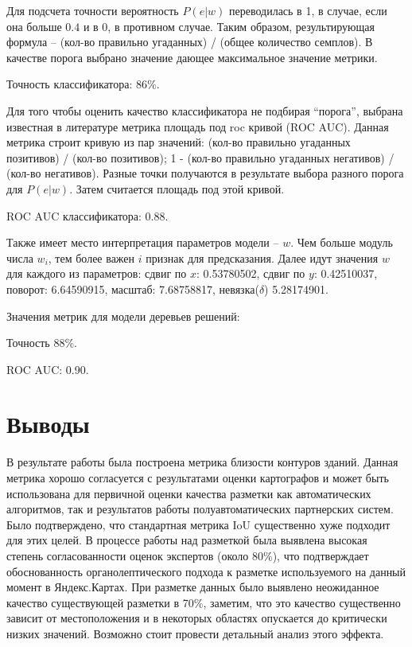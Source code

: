 \documentclass[12pt]{article}
\begin{document}
Для подсчета точности вероятность $P(e | w)$ переводилась в 1, в случае, если она больше $0.4$ и в 0, в противном случае. Таким образом, результирующая формула -- (кол-во правильно угаданных) / (общее количество семплов). В качестве порога выбрано значение дающее максимальное значение метрики.

Точность классификатора: 86\%.

Для того чтобы оценить качество классификатора не подбирая ``порога'', выбрана известная в литературе метрика площадь под roc кривой (ROC AUC). Данная метрика строит кривую из пар значений: (кол-во правильно угаданных позитивов)  / (кол-во позитивов); 1 - (кол-во правильно угаданных негативов) / (кол-во негативов). Разные точки получаются в результате выбора разного порога для $P(e | w)$. Затем считается площадь под этой кривой.

ROC AUC классификатора: 0.88.

Также имеет место интерпретация параметров модели -- $w$. Чем больше модуль числа $w_i$, тем более важен $i$ признак для предсказания. Далее идут значения $w$ для каждого из параметров:
сдвиг по $x$: 0.53780502, сдвиг по $y$: 0.42510037, поворот: 6.64590915, масштаб: 7.68758817, невязка($\delta$) 5.28174901.

Значения метрик для модели деревьев решений:

Точность 88\%.

ROC AUC: 0.90.

\section{Выводы}
\label{conclusions}
В результате работы была построена метрика близости контуров зданий. Данная метрика хорошо согласуется с результатами оценки картографов и может быть использована для первичной оценки качества разметки как автоматических алгоритмов, так и результатов работы полуавтоматических партнерских систем. Было подтверждено, что стандартная метрика IoU существенно хуже подходит для этих целей. В процессе работы над разметкой была выявлена высокая степень согласованности оценок экспертов (около 80\%), что подтверждает обоснованность органолептического подхода к разметке используемого на данный момент в Яндекс.Картах. При разметке данных было выявлено неожиданное качество существующей разметки в 70\%, заметим, что это качество существенно зависит от местоположения и в некоторых областях опускается до критически низких значений. Возможно стоит провести детальный анализ этого эффекта.
\end{document}
